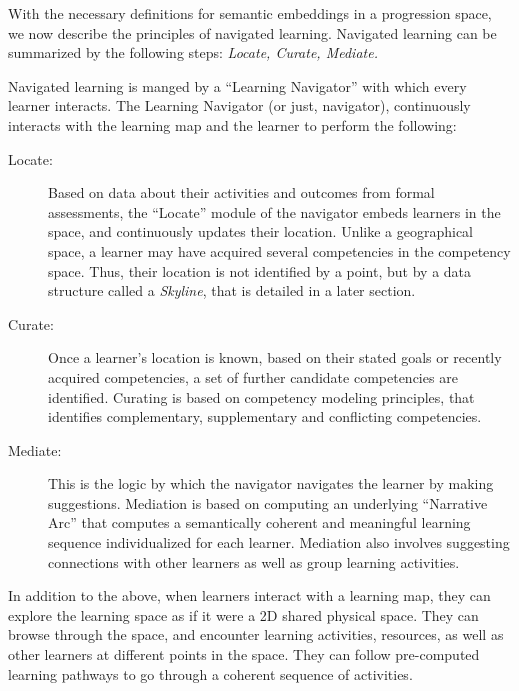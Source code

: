 \begin{multicols}{2}
With the necessary definitions for semantic embeddings in a progression space, we now describe the principles of navigated learning. Navigated learning can be summarized by the following steps: \textit{Locate, Curate, Mediate.}

Navigated learning is manged by a “Learning Navigator” with which every learner interacts. The Learning Navigator (or just, navigator), continuously interacts with the learning map and the learner to perform the following:
\begin{description}
\item[Locate:]  Based on data about their activities and outcomes from formal assessments, the “Locate” module of the navigator embeds learners in the space, and continuously updates their location. Unlike a geographical space, a learner may have acquired several competencies in the competency space. Thus, their location is not identified by a point, but by a data structure called a \textit{Skyline}, that is detailed in a later section.
\item[Curate:] Once a learner’s location is known, based on their stated goals or recently acquired competencies, a set of further candidate competencies are identified. Curating is based on competency modeling principles, that identifies complementary, supplementary and conflicting competencies.
\item[Mediate:] This is the logic by which the navigator navigates the learner by making suggestions. Mediation is based on computing an underlying “Narrative Arc” that computes a semantically coherent and meaningful learning sequence individualized for each learner. Mediation also involves suggesting connections with other learners as well as group learning activities.
\end{description}

In addition to the above, when learners interact with a learning map, they can explore the learning space as if it were a 2D shared physical space. They can browse through the space, and encounter learning activities, resources, as well as other learners at different points in the space. They can follow pre-computed learning pathways to go through a coherent sequence of activities.


\end{multicols}
